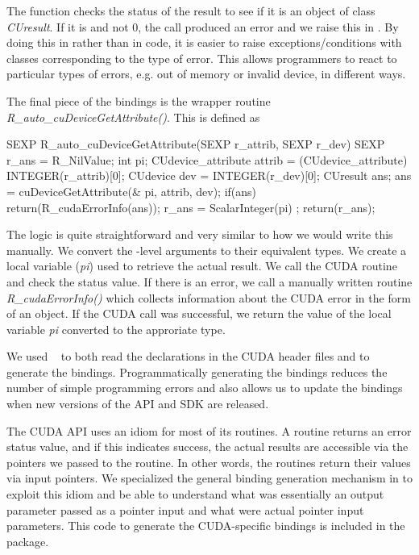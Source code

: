 \documentclass[article]{jss}
\def\C{\proglang{C}}
\def\R{\proglang{R}}
\def\Rpkg#1{\pkg{#1}}
\def\Cfunc#1{\textit{#1()}}
\def\Cvar#1{\textit{#1}}
\def\Rclass#1{\textit{#1}}
\begin{document}
The function checks the status of the result to see if it is an \R{}
object of class \Rclass{CUresult}. If it is and not $0$, the call
produced an error and we raise this in \R. By doing this in \R{}
rather than in \C{} code, it is easier to raise exceptions/conditions
with classes corresponding to the type of error. This allows
programmers to react to particular types of errors, e.g. out of memory
or invalid device, in different ways.

The final piece of the bindings is the \C{} wrapper routine
\Cfunc{R\_auto\_cuDeviceGetAttribute}. This is defined as 
\begin{CCode}
SEXP
R_auto_cuDeviceGetAttribute(SEXP r_attrib, SEXP r_dev)
{
    SEXP r_ans = R_NilValue;
    int pi;
    CUdevice_attribute attrib = (CUdevice_attribute) INTEGER(r_attrib)[0];
    CUdevice dev = INTEGER(r_dev)[0];
    CUresult ans;
    ans = cuDeviceGetAttribute(& pi,  attrib,  dev);
    if(ans)
       return(R_cudaErrorInfo(ans));
    r_ans = ScalarInteger(pi) ;
    return(r_ans);
}
\end{CCode}
The logic is quite straightforward and very similar to how we would
write this manually. We convert the \R-level arguments to their
equivalent \C{} types.  We create a local variable (\Cvar{pi}) used to
retrieve the actual result.  We call the CUDA routine and check the
status value.  If there is an error, we call a manually written
routine \Cfunc{R\_cudaErrorInfo} which collects information about the
CUDA error in the form of an \R{} object.  If the CUDA call was
successful, we return the value of the local variable \Cvar{pi}
converted to the approriate \R{} type.



We used \Rpkg{RCIndex}~\cite{bib:RCIndex} to both read the
declarations in the CUDA header files and to generate the bindings.
Programmatically generating the bindings reduces the number of simple
programming errors and also allows us to update the bindings when new
versions of the API and SDK are released.

The CUDA API uses an idiom for most of its routines.  A routine
returns an error status value, and if this indicates success, the
actual results are accessible via the pointers we passed to the
routine. In other words, the routines return their values via input
pointers.  We specialized the general binding generation mechanism in
\Rpkg{RCIndex} to exploit this idiom and be able to understand what
was essentially an output parameter passed as a pointer input and what
were actual pointer input parameters.  This code to generate the
CUDA-specific bindings is included in the package.
\end{document}
